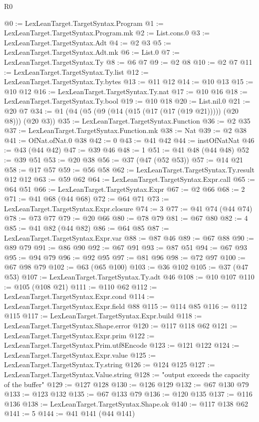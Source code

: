 \begin{lexlean}{R0}
\begin{coremodule}
{{{{{{{{{{{{{{{{{{{{{{{{{{{{{{{{@0 := LexLeanTarget.TargetSyntax.Program
@1 := LexLeanTarget.TargetSyntax.Program.mk
@2 := List.cons.{0}
@3 := LexLeanTarget.TargetSyntax.Adt
@4 := @2 @3
@5 := LexLeanTarget.TargetSyntax.Adt.mk
@6 := List.{0}
@7 := LexLeanTarget.TargetSyntax.Ty
@8 := @6 @7
@9 := @2 @8
@10 := @2 @7
@11 := LexLeanTarget.TargetSyntax.Ty.list
@12 := LexLeanTarget.TargetSyntax.Ty.bytes
@13 := @11 @12
@14 := @10 @13
@15 := @10 @12
@16 := LexLeanTarget.TargetSyntax.Ty.nat
@17 := @10 @16
@18 := LexLeanTarget.TargetSyntax.Ty.bool
@19 := @10 @18
@20 := List.nil.{0}
@21 := @20 @7
@34 := @1 (@4 (@5 (@9 (@14 (@15 (@17 (@17 (@19 @21))))) (@20 @8))) (@20 @3))
@35 := LexLeanTarget.TargetSyntax.Function
@36 := @2 @35
@37 := LexLeanTarget.TargetSyntax.Function.mk
@38 := Nat
@39 := @2 @38
@41 := OfNat.ofNat.{0} @38
@42 := 0
@43 := @41 @42
@44 := instOfNatNat
@46 := @43 (@44 @42)
@47 := @39 @46
@48 := 1
@51 := @41 @48 (@44 @48)
@52 := @39 @51
@53 := @20 @38
@56 := @37 (@47 (@52 @53))
@57 := @14 @21
@58 := @17 @57
@59 := @56 @58
@62 := LexLeanTarget.TargetSyntax.Ty.result @12 @12
@63 := @59 @62
@64 := LexLeanTarget.TargetSyntax.Expr.call
@65 := @64 @51
@66 := LexLeanTarget.TargetSyntax.Expr
@67 := @2 @66
@68 := 2
@71 := @41 @68 (@44 @68)
@72 := @64 @71
@73 := LexLeanTarget.TargetSyntax.Expr.closure
@74 := 3
@77 := @41 @74 (@44 @74)
@78 := @73 @77
@79 := @20 @66
@80 := @78 @79
@81 := @67 @80
@82 := 4
@85 := @41 @82 (@44 @82)
@86 := @64 @85
@87 := LexLeanTarget.TargetSyntax.Expr.var
@88 := @87 @46
@89 := @67 @88
@90 := @89 @79
@91 := @86 @90
@92 := @67 @91
@93 := @87 @51
@94 := @67 @93
@95 := @94 @79
@96 := @92 @95
@97 := @81 @96
@98 := @72 @97
@100 := @67 @98 @79
@102 := @63 (@65 @100)
@103 := @36 @102
@105 := @37 (@47 @53)
@107 := LexLeanTarget.TargetSyntax.Ty.adt @46
@108 := @10 @107
@110 := @105 (@108 @21)
@111 := @110 @62
@112 := LexLeanTarget.TargetSyntax.Expr.cond
@114 := LexLeanTarget.TargetSyntax.Expr.field @88
@115 := @114 @85
@116 := @112 @115
@117 := LexLeanTarget.TargetSyntax.Expr.build
@118 := LexLeanTarget.TargetSyntax.Shape.error
@120 := @117 @118 @62
@121 := LexLeanTarget.TargetSyntax.Expr.prim
@122 := LexLeanTarget.TargetSyntax.Prim.utf8Encode
@123 := @121 @122
@124 := LexLeanTarget.TargetSyntax.Expr.value
@125 := LexLeanTarget.TargetSyntax.Ty.string
@126 := @124 @125
@127 := LexLeanTarget.TargetSyntax.Value.string
@128 := "output exceeds the capacity of the buffer"
@129 := @127 @128
@130 := @126 @129
@132 := @67 @130 @79
@133 := @123 @132
@135 := @67 @133 @79
@136 := @120 @135
@137 := @116 @136
@138 := LexLeanTarget.TargetSyntax.Shape.ok
@140 := @117 @138 @62
@141 := 5
@144 := @41 @141 (@44 @141)
}}}}}}}}}}}}}}}}}}}}}}}}}}}}}}}}
\end{coremodule}
\end{lexlean}
